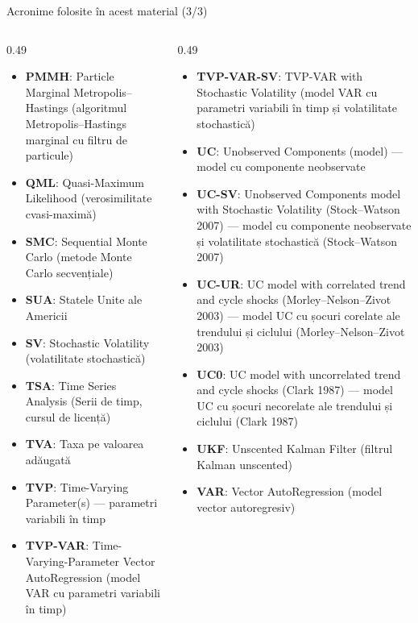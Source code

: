 \begin{frame}{Acronime folosite în acest material (3/3)}
\begin{columns}[T]
\begin{column}{0.49\textwidth}
\begin{itemize}\setlength{\itemsep}{0pt}
    \item \textbf{PMMH}: Particle Marginal Metropolis–Hastings (algoritmul Metropolis–Hastings marginal cu filtru de particule)
    \item \textbf{QML}: Quasi-Maximum Likelihood (verosimilitate cvasi-maximă)
    \item \textbf{SMC}: Sequential Monte Carlo (metode Monte Carlo secvențiale)
    \item \textbf{SUA}: Statele Unite ale Americii
    \item \textbf{SV}: Stochastic Volatility (volatilitate stochastică)
    \item \textbf{TSA}: Time Series Analysis (Serii de timp, cursul de licență)
    \item \textbf{TVA}: Taxa pe valoarea adăugată
    \item \textbf{TVP}: Time-Varying Parameter(s) — parametri variabili în timp
    \item \textbf{TVP-VAR}: Time-Varying-Parameter Vector AutoRegression (model VAR cu parametri variabili în timp)
\end{itemize}
\end{column}
\begin{column}{0.49\textwidth}
\begin{itemize}\setlength{\itemsep}{0pt}
    \item \textbf{TVP-VAR-SV}: TVP-VAR with Stochastic Volatility (model VAR cu parametri variabili în timp și volatilitate stochastică)
    \item \textbf{UC}: Unobserved Components (model) — model cu componente neobservate
    \item \textbf{UC-SV}: Unobserved Components model with Stochastic Volatility (Stock–Watson 2007) — model cu componente neobservate și volatilitate stochastică (Stock–Watson 2007)
    \item \textbf{UC-UR}: UC model with correlated trend and cycle shocks (Morley–Nelson–Zivot 2003) — model UC cu șocuri corelate ale trendului și ciclului (Morley–Nelson–Zivot 2003)
    \item \textbf{UC0}: UC model with uncorrelated trend and cycle shocks (Clark 1987) — model UC cu șocuri necorelate ale trendului și ciclului (Clark 1987)
    \item \textbf{UKF}: Unscented Kalman Filter (filtrul Kalman unscented)
    \item \textbf{VAR}: Vector AutoRegression (model vector autoregresiv)
\end{itemize}
\end{column}
\end{columns}
\end{frame}

